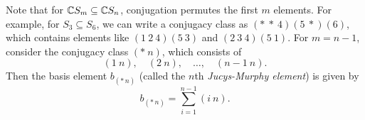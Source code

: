 \begin{example}
  Note that for $\mathbb{C} S_m \subseteq \mathbb{C} S_n$,
  conjugation permutes the first $m$
  elements. For example, for
  $S_3 \subseteq S_6$, we can
  write a conjugacy class as
  $({*}\ {*}\ 4)(5\ {*})(6)$, which
  contains elements like
  $(1\ 2\ 4)(5\ 3)$ and
  $(2\ 3\ 4)(5\ 1)$.
  For $m = n - 1$, consider the conjugacy
  class $({*}\ n)$, which consists of
  \[
    (1\ n), \quad (2\ n), \quad \ldots, \quad (n - 1\ n).
  \]
  Then the basis element $b_{({*}\, n)}$
  (called the $n$th \emph{Jucys-Murphy element}) is given by
  \[
    b_{({*}\, n)} = \sum_{i = 1}^{n - 1} (i\ n).
  \]
\end{example}
